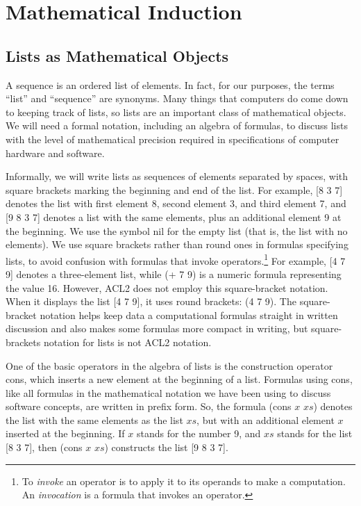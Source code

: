 \chapter{Mathematical Induction}
\label{ch:mathematical-induction}

\section{Lists as Mathematical Objects}
\label{sec:lists-as-obj}
A sequence
is an ordered list of elements.
In fact, for our purposes, the terms ``list'' and ``sequence'' are synonyms.
Many things that computers do come down to keeping track of lists,
so lists are an important class of mathematical objects.
We will need a formal notation, including an algebra of formulas,
to discuss lists with the level of mathematical precision
required in specifications of computer hardware and software.

Informally, we will write lists as sequences of elements separated by spaces,
with square brackets marking the beginning and end of the list.
For example, \textsf{[8 3 7]} denotes the list with first element 8,
second element 3, and third element 7, and
\textsf{[9 8 3 7]} denotes a list with the same elements,
plus an additional element 9 at the beginning.
\label{nil-def}
We use the symbol \textsf{nil} for the empty list
(that is, the list with no elements).
\label{square-brackets}We use
square brackets
rather than round ones in formulas
specifying lists, to avoid confusion with formulas that
invoke operators.\footnote{To \emph{invoke}
an operator is to apply it to its operands
to make a computation.
An \emph{invocation} is a formula that invokes an operator.}
For example, \textsf{[4 7 9]} denotes a three-element list,
while \textsf{(+ 7 9)} is a numeric formula representing the value 16.
However, ACL2 does not employ this square-bracket notation.
When it displays the list \textsf{[4 7 9]},
it uses round brackets: \textsf{(4 7 9)}.
The square-bracket notation helps keep data a computational formulas
straight in written discussion and also makes some
formulas more compact in writing, but square-brackets
notation for lists is not ACL2 notation.

One of the basic operators in the algebra of lists is the
construction operator
\textsf{cons},
which inserts a new element at the beginning of a list.
Formulas using \textsf{cons}, like all formulas in
the mathematical notation we have been using to discuss software concepts,
are written in prefix form.
So, the formula \textsf{(cons $x$ $xs$)} denotes the list
with the same elements as the list $xs$,
but with an additional element $x$ inserted at the beginning.
If $x$ stands for the number 9,
and $xs$ stands for the list \textsf{[8 3 7]},
then \textsf{(cons $x$ $xs$)} constructs the list \textsf{[9 8 3 7]}.

